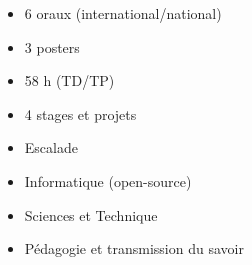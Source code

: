\begin{itemize}
	\item 6 oraux (international/national)
	\item 3 posters
\end{itemize}


\begin{itemize}
	\item 58 h (TD/TP)
\end{itemize}

\begin{itemize}
	\item 4 stages et projets
\end{itemize}

\medskip
{}

\begin{itemize}
	\item Escalade
	\item Informatique (open-source)
	\item Sciences et Technique
	\item Pédagogie et transmission du savoir
\end{itemize}









%
%
%




